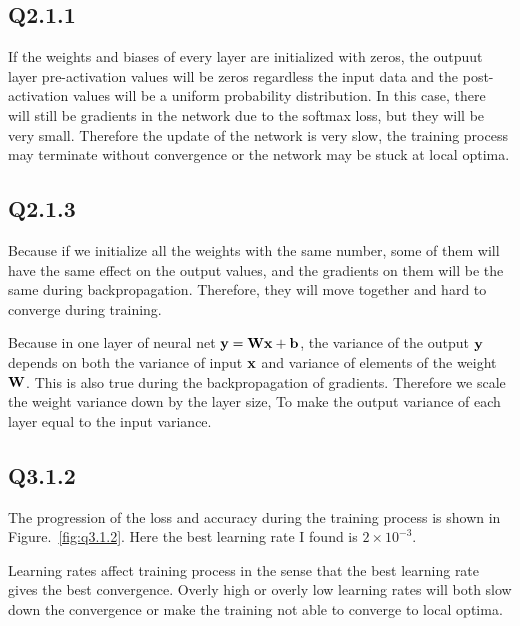 \documentclass[11pt]{article}
\begin{document}
\newpage

\subsection*{Q2.1.1}

If the weights and biases of every layer are initialized with zeros, the outpuut layer pre-activation values will be zeros regardless the input data and the post-activation values will be a uniform probability distribution.
In this case, there will still be gradients in the network due to the softmax loss, but they will be very small. Therefore the update of the network is very slow, the training process may terminate without convergence or the network may be stuck at local optima.

\newpage

\subsection*{Q2.1.3}

Because if we initialize all the weights with the same number, some of them will have the same effect on the output values, and the gradients on them will be the same during backpropagation. Therefore, they will move together and hard to converge during training.

Because in one layer of neural net $\mathbf{y}=\mathbf{W}\mathbf{x}+\mathbf{b}$, the variance of the output $\mathbf{y}$ depends on both the variance of input $\mathbf{x}$ and variance of elements of the weight $\mathbf{W}$. This is also true during the backpropagation of gradients. Therefore we scale the weight variance down by the layer size, To make the output variance of each layer equal to the input variance.

\newpage

\subsection*{Q3.1.2}

The progression of the loss and accuracy during the training process is shown in Figure.~\ref{fig:q3.1.2}. Here the best learning rate I found is $2\times10^{-3}$.

Learning rates affect training process in the sense that the best learning rate gives the best convergence. Overly high or overly low learning rates will both slow down the convergence or make the training not able to converge to local optima.
\end{document}
